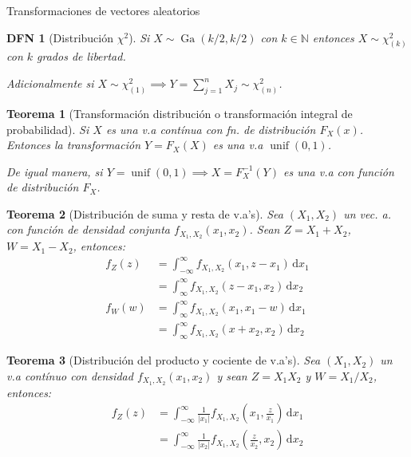 \documentclass[a4paper]{article}
\newtheorem{definition}{DFN}
\theoremstyle{mytheoremstyle}
\newtheorem{theorem}{Teorema}
\newcommand{\N}{\mathbb{N}}
\newcommand{\1}{\mathds{1}}
\DeclareMathOperator{\unif}{unif}
\DeclareMathOperator{\dgamma}{Ga}
\newcommand{\diff}[1]{\,\mathrm{d}#1}
\begin{document}
\begin{multicols*}{3}
\begin{roundbox}{Transformaciones de vectores aleatorios}
\begin{definition}[Distribución $\chi^2$]
    Si $X \sim \dgamma(k/2, k/2)$ con $k \in \N$ entonces $X \sim \chi^2_{(k)}$ con $k$ grados de libertad.

    Adicionalmente si $X \sim \chi^2_{(1)} \implies Y = \sum_{j=1}^{n} X_j \sim \chi^{2}_{(n)}$.
\end{definition}

\begin{theorem}[Transformación distribución o transformación integral de probabilidad]
    Si $X$ es una v.a contínua con fn. de distribución $F_X(x)$.
    Entonces la transformación $Y=F_X(X)$ es una v.a $\unif(0,1)$.
    
    De igual manera, si $Y = \unif(0,1) \implies X = F_{X}^{-1}(Y)$ es una v.a con función de distribución $F_X$.
\end{theorem}

\begin{theorem}[Distribución de suma y resta de v.a's]
    Sea $(X_1, X_2)$ un vec. a. con función de densidad conjunta $f_{X_1, X_2}(x_1, x_2)$.
    Sean $Z=X_1 + X_2$, $W=X_1 - X_2$, entonces:
    \begin{align*}
        f_Z(z) &= \int_{-\infty}^{\infty} f_{X_1, X_2} (x_1, z-x_1) \diff{x_1}\\  
        &= \int_{\infty}^{\infty} f_{X_1, X_2}(z-x_1, x_2) \diff{x_2} \\
        f_W(w) &= \int_{\infty}^{\infty} f_{X_1, X_2}(x_1, x_1- w) \diff{x_1} \\
        &= \int_{\infty}^{\infty} f_{X_1, X_2}(x+x_2, x_2) \diff{x_2 }
    \end{align*}
\end{theorem}

\begin{theorem}[Distribución del producto y cociente de v.a's]
    Sea $(X_1, X_2)$ un v.a contínuo con densidad $f_{X_1, X_2}(x_1, x_2)$ y sean $Z=X_1X_2$ y $W=X_1 / X_2$, entonces:
    \begin{align*}
        f_Z(z) &= \int_{-\infty}^{\infty} \frac{1}{|x_1|} f_{X_1, X_2} \left( x_1, \frac{z}{x_1} \right) \diff{x_1} \\
        &= \int_{-\infty}^{\infty} \frac{1}{|x_2|} f_{X_1, X_2} \left( \frac{z}{x_2}, x_2 \right) \diff{x_2}\\
    \end{align*}
\end{theorem}
\end{roundbox}


\end{multicols*}
\end{document}
